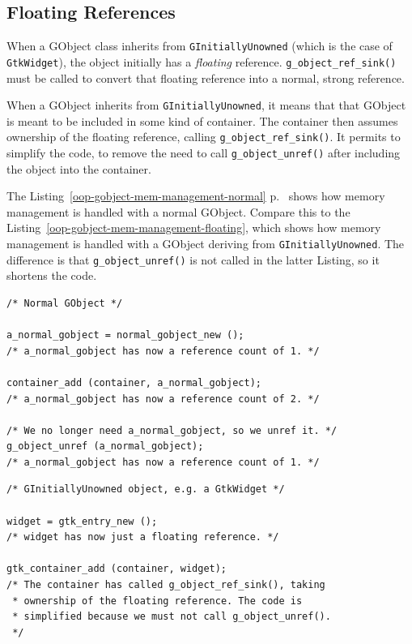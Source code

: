 \subsection{Floating References}

When a GObject class inherits from \lstinline{GInitiallyUnowned} (which is the case of \lstinline{GtkWidget}), the object initially has a \emph{floating} reference. \lstinline{g_object_ref_sink()} must be called to convert that floating reference into a normal, strong reference.

When a GObject inherits from \lstinline{GInitiallyUnowned}, it means that that GObject is meant to be included in some kind of container. The container then assumes ownership of the floating reference, calling \lstinline{g_object_ref_sink()}. It permits to simplify the code, to remove the need to call \lstinline{g_object_unref()} after including the object into the container.

The Listing~\ref{oop-gobject-mem-management-normal} p.~\pageref{oop-gobject-mem-management-normal} shows how memory management is handled with a normal GObject. Compare this to the Listing~\ref{oop-gobject-mem-management-floating}, which shows how memory management is handled with a GObject deriving from \lstinline{GInitiallyUnowned}. The difference is that \lstinline{g_object_unref()} is not called in the latter Listing, so it shortens the code.

\begin{lstlisting}[float=p, caption={Memory management of normal GObjects.}, label=oop-gobject-mem-management-normal]
/* Normal GObject */

a_normal_gobject = normal_gobject_new ();
/* a_normal_gobject has now a reference count of 1. */

container_add (container, a_normal_gobject);
/* a_normal_gobject has now a reference count of 2. */

/* We no longer need a_normal_gobject, so we unref it. */
g_object_unref (a_normal_gobject);
/* a_normal_gobject has now a reference count of 1. */
\end{lstlisting}

\begin{lstlisting}[float=p, caption={Memory management of GObjects deriving from \lstinline{GInitiallyUnowned}.}, label=oop-gobject-mem-management-floating]
/* GInitiallyUnowned object, e.g. a GtkWidget */

widget = gtk_entry_new ();
/* widget has now just a floating reference. */

gtk_container_add (container, widget);
/* The container has called g_object_ref_sink(), taking
 * ownership of the floating reference. The code is
 * simplified because we must not call g_object_unref().
 */
\end{lstlisting}


